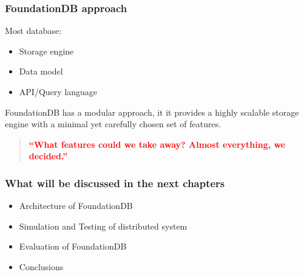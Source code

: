 \begin{frame}
	\frametitle{FoundationDB approach}
Most database: 
    \begin{itemize}
        \item Storage engine
        \item Data model
        \item API/Query language
    \end{itemize}

FoundationDB has a modular approach, it it provides a highly scalable storage engine with a minimal yet carefully chosen set of features.

\vspace{0.5cm}
\begin{quote}
    \textbf{\textcolor{red}{``What features could we take away? Almost everything, we decided.''}}
\end{quote}
        
\end{frame}



\begin{frame}
	\frametitle{What will be discussed in the next chapters}

    \begin{itemize}
        \item Architecture of FoundationDB
        \item Simulation and Testing of distributed system
        \item Evaluation of FoundationDB
        \item Conclusions
    \end{itemize}
        
\end{frame}


